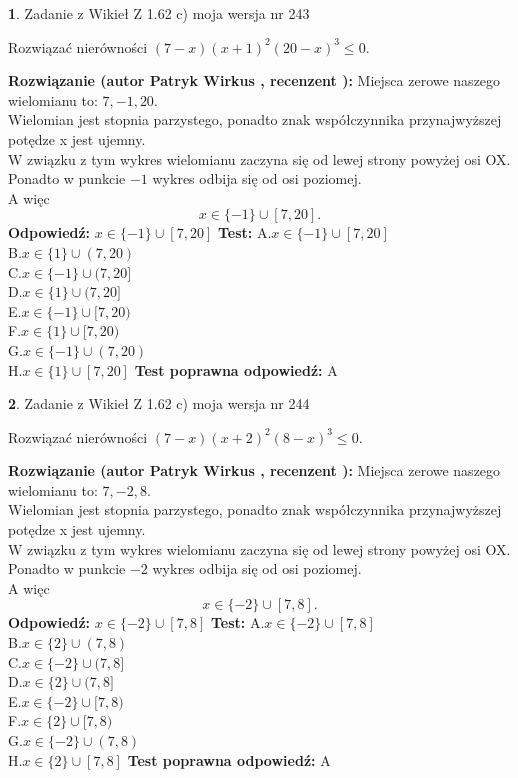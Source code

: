 \documentclass[12pt, a4paper]{article}
\theoremstyle{definition} %
\newtheorem{zad}{}
\newcommand{\zadStart}[1]{\begin{zad}#1\newline}
\newcommand{\zadStop}{\end{zad}}
\newcommand{\rozwStart}[2]{\noindent \textbf{Rozwiązanie (autor #1 , recenzent #2): }\newline}
\newcommand{\rozwStop}{\newline}
\newcommand{\odpStart}{\noindent \textbf{Odpowiedź:}\newline}
\newcommand{\odpStop}{\newline}
\newcommand{\testStart}{\noindent \textbf{Test:}\newline}
\newcommand{\testStop}{\newline}
\newcommand{\kluczStart}{\noindent \textbf{Test poprawna odpowiedź:}\newline}
\newcommand{\kluczStop}{\newline}
\begin{document}
\zadStart{Zadanie z Wikieł Z 1.62 c) moja wersja nr 243}

Rozwiązać nierówności $(7-x)(x+1)^{2}(20-x)^{3}\le0$.
\zadStop
\rozwStart{Patryk Wirkus}{}
Miejsca zerowe naszego wielomianu to: $7, -1, 20$.\\
Wielomian jest stopnia parzystego, ponadto znak współczynnika przy\linebreak najwyższej potędze x jest ujemny.\\ W związku z tym wykres wielomianu zaczyna się od lewej strony powyżej osi OX.\\
Ponadto w punkcie $-1$ wykres odbija się od osi poziomej.\\
A więc $$x \in \{-1\} \cup [7,20].$$
\rozwStop
\odpStart
$x \in \{-1\} \cup [7,20]$
\odpStop
\testStart
A.$x \in \{-1\} \cup [7,20]$\\
B.$x \in \{1\} \cup (7,20)$\\
C.$x \in \{-1\} \cup (7,20]$\\
D.$x \in \{1\} \cup (7,20]$\\
E.$x \in \{-1\} \cup [7,20)$\\
F.$x \in \{1\} \cup [7,20)$\\
G.$x \in \{-1\} \cup (7,20)$\\
H.$x \in \{1\} \cup [7,20]$
\testStop
\kluczStart
A
\kluczStop



\zadStart{Zadanie z Wikieł Z 1.62 c) moja wersja nr 244}

Rozwiązać nierówności $(7-x)(x+2)^{2}(8-x)^{3}\le0$.
\zadStop
\rozwStart{Patryk Wirkus}{}
Miejsca zerowe naszego wielomianu to: $7, -2, 8$.\\
Wielomian jest stopnia parzystego, ponadto znak współczynnika przy\linebreak najwyższej potędze x jest ujemny.\\ W związku z tym wykres wielomianu zaczyna się od lewej strony powyżej osi OX.\\
Ponadto w punkcie $-2$ wykres odbija się od osi poziomej.\\
A więc $$x \in \{-2\} \cup [7,8].$$
\rozwStop
\odpStart
$x \in \{-2\} \cup [7,8]$
\odpStop
\testStart
A.$x \in \{-2\} \cup [7,8]$\\
B.$x \in \{2\} \cup (7,8)$\\
C.$x \in \{-2\} \cup (7,8]$\\
D.$x \in \{2\} \cup (7,8]$\\
E.$x \in \{-2\} \cup [7,8)$\\
F.$x \in \{2\} \cup [7,8)$\\
G.$x \in \{-2\} \cup (7,8)$\\
H.$x \in \{2\} \cup [7,8]$
\testStop
\kluczStart
A
\kluczStop
\end{document}
